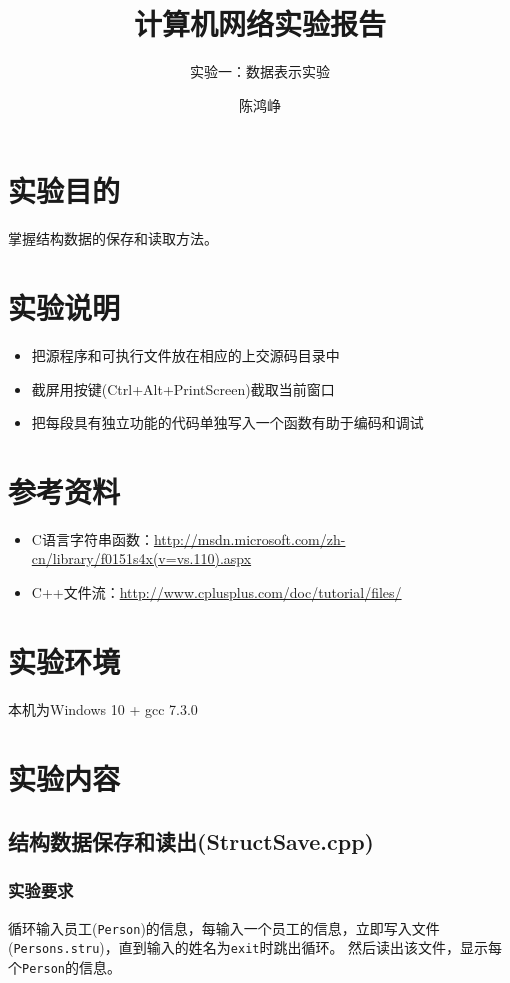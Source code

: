 \documentclass[logo,reportComp]{thesis}
\title{计算机网络实验报告}
\subtitle{实验一：数据表示实验}
\author{陈鸿峥}
\begin{document}
\maketitle

\section{实验目的}
掌握结构数据的保存和读取方法。

\section{实验说明}
\begin{itemize}
	\item 把源程序和可执行文件放在相应的上交源码目录中
	\item 截屏用按键(Ctrl+Alt+PrintScreen)截取当前窗口
	\item 把每段具有独立功能的代码单独写入一个函数有助于编码和调试
\end{itemize}

\section{参考资料}
\begin{itemize}
	\item C语言字符串函数：{\small\url{http://msdn.microsoft.com/zh-cn/library/f0151s4x(v=vs.110).aspx}}
	\item C++文件流：{\small\url{http://www.cplusplus.com/doc/tutorial/files/}}
\end{itemize}

\section{实验环境}
本机为Windows 10 + gcc 7.3.0

\section{实验内容}
\subsection{结构数据保存和读出(StructSave.cpp)}
\subsubsection{实验要求}
循环输入员工(\verb'Person')的信息，每输入一个员工的信息，立即写入文件(\verb'Persons.stru')，直到输入的姓名为\verb'exit'时跳出循环。
然后读出该文件，显示每个\verb'Person'的信息。
\end{document}

